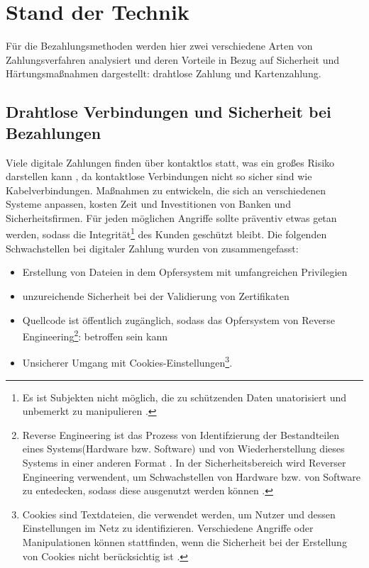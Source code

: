 \section{Stand der Technik}

Für die Bezahlungsmethoden werden hier zwei verschiedene Arten von Zahlungsverfahren analysiert und deren
Vorteile in Bezug auf Sicherheit und Härtungsmaßnahmen dargestellt: drahtlose Zahlung und Kartenzahlung.

\subsection{Drahtlose Verbindungen und Sicherheit bei Bezahlungen}

Viele digitale Zahlungen finden über kontaktlos statt, was ein großes Risiko darstellen kann \cite{refip:NYRS}, 
da kontaktlose Verbindungen nicht so sicher sind wie Kabelverbindungen. Maßnahmen zu entwickeln, die sich an 
verschiedenen Systeme anpassen, kosten Zeit und Investitionen von Banken und Sicherheitsfirmen. 
Für jeden möglichen Angriffe sollte präventiv etwas getan werden, sodass die Integrität\footnote{Es ist Subjekten
nicht möglich, die zu schützenden Daten unatorisiert und unbemerkt zu manipulieren \cite{refbook:SWIS}.} 
des Kunden geschützt bleibt. Die folgenden Schwachstellen bei digitaler Zahlung wurden von \cite{refip:NYRS}
zusammengefasst:

\begin{itemize}
    \item Erstellung von Dateien in dem Opfersystem mit umfangreichen Privilegien
    \item unzureichende Sicherheit bei der Validierung von Zertifikaten
    \item Quellcode ist öffentlich zugänglich, sodass das Opfersystem von Reverse
    Engineering\footnote{Reverse Engineering ist das Prozess von Identifzierung der Bestandteilen 
    eines Systems(Hardware bzw. Software) und von Wiederherstellung dieses Systems in einer anderen Format
    \cite{refart:CHRE}. In der Sicherheitsbereich wird Reverser Engineering verwendent, um Schwachstellen 
    von Hardware bzw. von Software zu entedecken, sodass diese ausgenutzt werden können \cite{refip:CMBM}.}: 
    betroffen sein kann
    \item Unsicherer Umgang mit Cookies-Einstellungen\footnote{Cookies sind Textdateien, die verwendet werden, um Nutzer und
    dessen Einstellungen im Netz zu identifizieren. Verschiedene Angriffe oder Manipulationen können stattfinden,
    wenn die Sicherheit bei der Erstellung von Cookies nicht berücksichtig ist \cite{refart:HSSC}.}.
\end{itemize}

